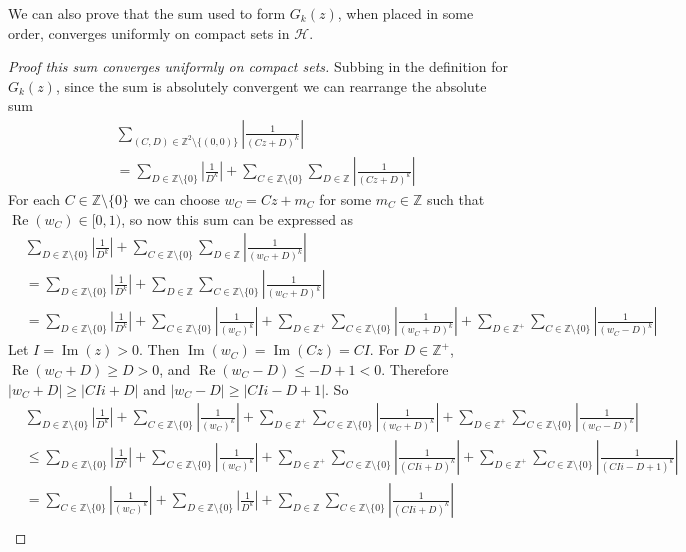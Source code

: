 \documentclass{article}
\theoremstyle{definition}
\theoremstyle{definition}
\theoremstyle{definition}
\newcommand{\Z}{\mathbb{Z}}
\begin{document}
We can also prove that the sum used to form $G_k(z)$, when placed in some order, converges uniformly on compact sets in $\mathcal H$.
\begin{proof}[Proof this sum converges uniformly on compact sets]
   Subbing in the definition for $G_k(z)$, since the sum is absolutely convergent we can rearrange the absolute sum
   \begin{align*}
   & \sum_{(C, D) \in \Z^2 \setminus \{(0, 0)\}} \left| \frac{1}{(Cz +
  D)^k} \right|\\
  & = \sum_{D \in \Z \setminus \{0\}} \left| \frac{1}{D^k} \right| + \sum_{C
  \in \mathbb{Z} \setminus \{ 0 \}} \sum_{D \in \mathbb{Z}} \left|
  \frac{1}{(Cz + D)^k} \right|
\end{align*}
For each $C\in\Z\setminus\{0\}$ we can choose $w_C=Cz+m_C$ for some $m_C\in\mathbb Z$ such that $\operatorname{Re}(w_C)\in[0,1)$, so now this sum can be expressed as
\begin{align*}
  & \sum_{D \in \Z \setminus \{0\}} \left| \frac{1}{D^k} \right| + \sum_{C
  \in \mathbb{Z} \setminus \{0\}} \sum_{D \in \mathbb{Z}} \left| \frac{1}{(w_C
  + D)^k} \right|\\
  & = \sum_{D \in \Z \setminus \{0\}} \left| \frac{1}{D^k} \right| + \sum_{D
  \in \mathbb{Z}} \sum_{C \in \mathbb{Z} \setminus \{0\}} \left| \frac{1}{(w_C
  + D)^k} \right|\\
  & = \sum_{D \in \Z \setminus \{0\}} \left| \frac{1}{D^k} \right| + \sum_{C
  \in \mathbb{Z} \setminus \{0\}} \left| \frac{1}{(w_C)^k} \right| + \sum_{D
  \in \mathbb{Z}^+} \sum_{C \in \mathbb{Z} \setminus \{0\}} \left|
  \frac{1}{(w_C + D)^k} \right| + \sum_{D \in \mathbb{Z}^+} \sum_{C \in
  \mathbb{Z} \setminus \{0\}} \left| \frac{1}{(w_C - D)^k} \right|
\end{align*}
Let $I=\operatorname{Im }(z)>0$. Then $\operatorname{Im}(w_C)=\operatorname{Im}(Cz)=CI$. For $D\in\Z^+$, $\operatorname{Re}(w_C+D)\geq D>0$, and $\operatorname{Re}(w_C-D)\leq -D+1<0$. Therefore $|w_C+D|\geq|CIi+D|$ and $|w_C-D|\geq|CIi-D+1|$. So
\begin{align*}
  &\sum_{D \in \Z \setminus \{0\}} \left| \frac{1}{D^k} \right| + \sum_{C
  \in \mathbb{Z} \setminus \{0\}} \left| \frac{1}{(w_C)^k} \right| + \sum_{D
  \in \mathbb{Z}^+} \sum_{C \in \mathbb{Z} \setminus \{0\}} \left|
  \frac{1}{(w_C + D)^k} \right| + \sum_{D \in \mathbb{Z}^+} \sum_{C \in
  \mathbb{Z} \setminus \{0\}} \left| \frac{1}{(w_C - D)^k} \right|\\
  &\leq\sum_{D \in \Z \setminus \{0\}} \left| \frac{1}{D^k} \right| + \sum_{C
  \in \mathbb{Z} \setminus \{0\}} \left| \frac{1}{(w_C)^k} \right| + \sum_{D
  \in \mathbb{Z}^+} \sum_{C \in \mathbb{Z} \setminus \{0\}} \left|
  \frac{1}{(CIi + D)^k} \right| + \sum_{D \in \mathbb{Z}^+} \sum_{C \in
  \mathbb{Z} \setminus \{0\}} \left| \frac{1}{(CIi-D+1)^k} \right|\\
  &= \sum_{C \in \mathbb{Z} \setminus \{0\}} \left| \frac{1}{(w_C)^k} \right| +\sum_{D \in \Z \setminus \{0\}} \left| \frac{1}{D^k} \right| + \sum_{D
  \in \mathbb{Z}} \sum_{C \in \mathbb{Z} \setminus \{0\}} \left|
  \frac{1}{(CIi + D)^k} \right|\\
\end{align*}


\end{proof}
\end{document}
